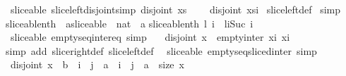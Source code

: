 \begin{isabellebody}
\ {\isacharparenleft}\ sliceable{\isacharparenright}\ slice{\isacharunderscore}left{\isacharunderscore}disjoint{\isacharbrackleft}simp{\isacharbrackright}{\isacharcolon}\ {\isachardoublequoteopen}disjoint\ xs\ {\isasymLongrightarrow}\ \isanewline
\ \ disjoint\ {\isacharparenleft}xs{\isasymdagger}i{\isachardot}{\isachardot}{\isacharparenright}{\isachardoublequoteclose}\isanewline
%
\isadelimproof
%
\endisadelimproof
%
\isatagproof
{}\isamarkupfalse%
\ slice{\isacharunderscore}left{\isacharunderscore}def\isanewline
{}\isamarkupfalse%
\ simp%
\endisatagproof
{\isafoldproof}%
%
\isadelimproof
%
\endisadelimproof
%
\isamarkuptrue%
\isamarkupfalse%
\ sliceable{\isacharunderscore}nth\ {\isacharcolon}{\isacharcolon}\ {\isachardoublequoteopen}{\isacharprime}a{\isacharcolon}{\isacharcolon}sliceable\ {\isasymRightarrow}\ nat\ {\isasymRightarrow}\ {\isacharprime}a{\isachardoublequoteclose}\isanewline
{}\isanewline
{\isachardoublequoteopen}sliceable{\isacharunderscore}nth\ l\ i\ {\isasymequiv}\ l{\isasymdagger}i{\isachardot}{\isachardot}{\isacharparenleft}Suc\ i{\isacharparenright}{\isachardoublequoteclose}%
\isamarkuptrue%
\isamarkupfalse%
\ {\isacharparenleft}\ sliceable{\isacharparenright}\ empty{\isacharunderscore}seq{\isacharunderscore}inter{\isacharunderscore}eq\ {\isacharbrackleft}simp{\isacharbrackright}{\isacharcolon}\ \isanewline
\ \ {\isachardoublequoteopen}disjoint\ x\ {\isasymLongrightarrow}\ empty{\isacharunderscore}inter\ {\isacharparenleft}x{\isasymdagger}{\isachardot}{\isachardot}i{\isacharparenright}\ {\isacharparenleft}x{\isasymdagger}i{\isachardot}{\isachardot}{\isacharparenright}{\isachardoublequoteclose}\isanewline
%
\isadelimproof
%
\endisadelimproof
%
\isatagproof
{}\isamarkupfalse%
\ {\isacharparenleft}simp\ add{\isacharcolon}\ slice{\isacharunderscore}right{\isacharunderscore}def\ slice{\isacharunderscore}left{\isacharunderscore}def{\isacharparenright}%
\endisatagproof
{\isafoldproof}%
%
\isadelimproof
\isanewline
%
\endisadelimproof
\isanewline
{}\isamarkupfalse%
\ {\isacharparenleft}\ sliceable{\isacharparenright}\ empty{\isacharunderscore}seq{\isacharunderscore}sliced{\isacharunderscore}inter\ {\isacharbrackleft}simp{\isacharbrackright}{\isacharcolon}\ \isanewline
\ \ {\isachardoublequoteopen}disjoint\ x\ {\isasymLongrightarrow}\ b\ {\isasymle}\ i\ {\isasymLongrightarrow}\ j\ {\isasymle}\ a\ {\isasymLongrightarrow}\ i\ {\isasymle}\ j\ {\isasymLongrightarrow}\ a\ {\isasymle}\ size\ x\ {\isasymLongrightarrow}\ \isanewline

\end{isabellebody}

